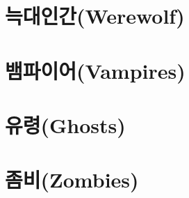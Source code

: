 \documentclass{report}
\begin{document}
	\section{늑대인간(Werewolf)}
		
	
	\section{뱀파이어(Vampires)}
		
	
	\section{유령(Ghosts)}
		
	
	\section{좀비(Zombies)}
		
\end{document}
